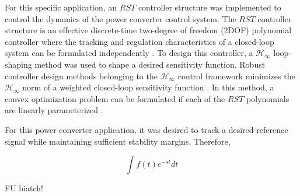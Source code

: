 \documentclass[11pt,english]{article}
\begin{document}
For this specific application, an $RST$ controller structure was implemented to control the dynamics of the power converter control system. The $RST$ controller structure is an effective discrete-time two-degree of freedom (2DOF) polynomial controller where the tracking and regulation characteristics of a closed-loop system can be formulated independently \cite{LZ06}. To design this controller, a $\mathcal{H}_\infty$ loop-shaping method was used to shape a desired sensitivity function. Robust controller design methods belonging to the $\mathcal{H}_{\infty}$ control framework minimizes the $\mathcal{H}_{\infty}$ norm of a weighted closed-loop sensitivity function \cite{ZD98}. In this method, a convex optimization problem can be formulated if each of the $RST$ polynomials are linearly parameterized \cite{NEK15}. 

For this power converter application, it was desired to track a desired reference signal while maintaining sufficient stability margins. Therefore, 

\begin{equation}
\int f(t)e^{-st}dt
\end{equation}

FU biatch!

\end{document}

